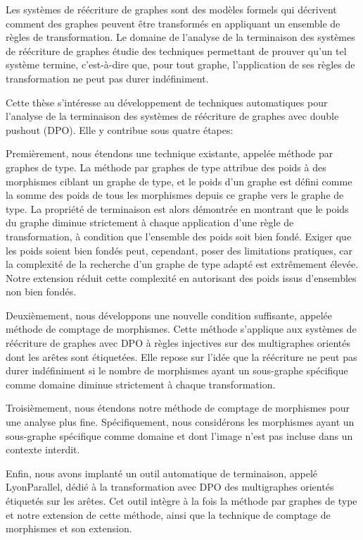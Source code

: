 Les systèmes de réécriture de graphes sont des modèles formels qui décrivent comment des graphes peuvent être transformés en appliquant un ensemble de règles de transformation. Le domaine de l'analyse de la terminaison des systèmes de réécriture de graphes étudie des techniques permettant de prouver qu'un tel système termine, c'est-à-dire que, pour tout graphe, l'application de ses règles de transformation ne peut pas durer indéfiniment. 

Cette thèse s'intéresse au développement de techniques automatiques pour l'analyse de la terminaison des systèmes de réécriture de graphes avec double pushout (DPO).
Elle y contribue sous quatre étapes:

Premièrement, nous étendons une technique existante, appelée méthode par graphes de type. La méthode par graphes de type attribue des poids à des morphismes ciblant un graphe de type, et le poids d'un graphe est défini comme la somme des poids de tous les morphismes depuis ce graphe vers le graphe de type. La propriété de terminaison est alors démontrée en montrant que le poids du graphe diminue strictement à chaque application d'une règle de transformation, à condition que l'ensemble des poids soit bien fondé. Exiger que les poids soient bien fondés peut, cependant, poser des limitations pratiques, car la complexité de la recherche d'un graphe de type adapté est extrêmement élevée. Notre extension réduit cette complexité en autorisant des poids issus d'ensembles non bien fondés.

Deuxièmement, nous développons une nouvelle condition suffisante, appelée méthode de comptage de morphismes. Cette méthode s'applique aux systèmes de réécriture de graphes avec DPO à règles injectives sur des multigraphes orientés dont les arêtes sont étiquetées. Elle repose sur l'idée que la réécriture ne peut pas durer indéfiniment si le nombre de morphismes ayant un sous-graphe spécifique comme domaine diminue strictement à chaque transformation.

Troisièmement, nous étendons notre méthode de comptage de morphismes pour une analyse plus fine. Spécifiquement, nous considérons les morphismes ayant un sous-graphe spécifique comme domaine et dont l'image n'est pas incluse dans un contexte interdit.

Enfin, nous avons implanté un outil automatique de terminaison, appelé LyonParallel, dédié à la transformation avec DPO des multigraphes orientés étiquetés sur les arêtes. Cet outil intègre à la fois la méthode par graphes de type et notre extension de cette méthode, ainsi que la technique de comptage de morphismes et son extension.

